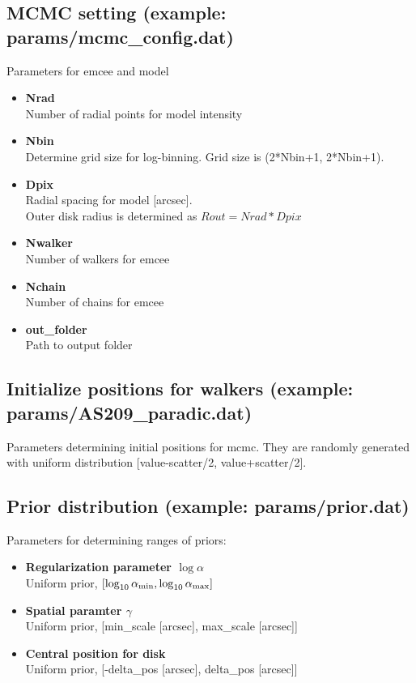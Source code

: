 \documentclass{report}
\begin{document}
\subsection{MCMC setting (example: params/mcmc\_config.dat) \label{sec:mcmc_config}}
Parameters for emcee and model
\begin{itemize}
    \item \textbf{Nrad} \\
    Number of radial points for model intensity
    \item \textbf{Nbin} \\
    Determine grid size for log-binning. Grid size is (2*Nbin+1, 2*Nbin+1). 
    \item \textbf{Dpix}\\
    Radial spacing for model [arcsec].\\ Outer disk radius is determined as $Rout = Nrad * Dpix$
    \item \textbf{Nwalker}\\
    Number of walkers for emcee
    \item \textbf{Nchain}\\
    Number of chains for emcee
    \item \textbf{out\_folder}\\
    Path to output folder
\end{itemize}

\subsection{Initialize positions for walkers (example: params/AS209\_paradic.dat)  \label{sec:initial_para}}
Parameters determining initial positions for mcmc. They are randomly generated with uniform distribution [value-scatter/2, value+scatter/2].

\subsection{Prior distribution (example: params/prior.dat)  \label{sec:prior_config}}
Parameters for determining ranges of priors: 
\begin{itemize}
    \item {\bf Regularization parameter $\log \alpha$}\\
    Uniform prior, $[\log_{10}\alpha_{\rm min}, \log_{10}\alpha_{\rm max}]$
    \item {\bf Spatial paramter $\gamma$} \\ Uniform prior, [min\_scale [arcsec], max\_scale [arcsec]]
    \item {\bf Central position for disk} \\ 
    Uniform prior,  [-delta\_pos [arcsec], delta\_pos [arcsec]]
\end{itemize}
\end{document}
